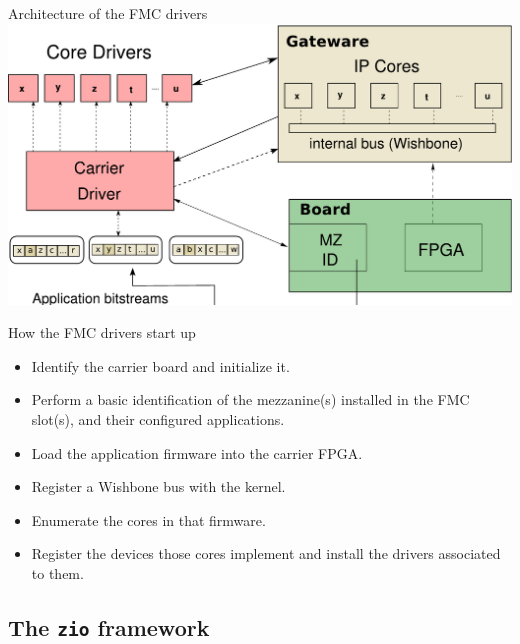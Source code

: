 \documentclass[compress,red]{beamer}
\begin{document}
\begin{frame}{Architecture of the FMC drivers}
\includegraphics[height=0.8\textheight]{driverarch.pdf}
\end{frame}

\begin{frame}{How the FMC drivers start up}
\begin{itemize}
\item Identify the carrier board and initialize it.
\item Perform a basic identification of the mezzanine(s) installed in
    the FMC slot(s), and their configured applications.
\item Load the application firmware into the carrier FPGA.
\item Register a Wishbone bus with the kernel.
\item Enumerate the cores in that firmware.
\item Register the devices those cores implement and install the drivers
    associated to them.
\end{itemize}
\end{frame}



\subsection{The \texttt{zio} framework}
\end{document}
